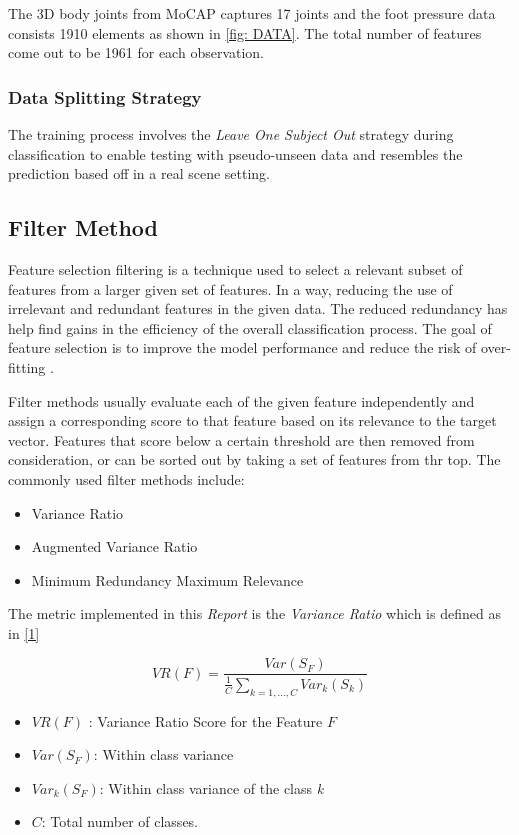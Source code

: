 \documentclass[12pt,twoside,a4paper]{article}
\begin{document}
The 3D body joints from MoCAP captures 17 joints and the foot pressure data consists 1910 elements as shown in \ref{fig: DATA}. The total number of features come out to be 1961 for each observation.
\subsubsection*{Data Splitting Strategy}
The training process involves the \textit{Leave One Subject Out} strategy during classification to enable testing with pseudo-unseen data and resembles the prediction based off in a real scene setting. 

\subsection{Filter Method}

Feature selection filtering is a technique used to select a relevant subset of features from a larger given set of features. In a way, reducing the use of irrelevant and redundant features in the given data. The reduced redundancy has help find gains in the efficiency of the overall classification process. The goal of feature selection is to improve the model performance and reduce the risk of over-fitting \cite{statistical}.

Filter methods usually evaluate each of the given feature independently and assign a corresponding score to that feature based on its relevance to the target vector. Features that score below a certain threshold are then removed from consideration, or can be sorted out by taking a set of features from thr top. The commonly used filter methods include:

\begin{itemize}
    \item Variance Ratio
    \item Augmented Variance Ratio
    \item Minimum Redundancy Maximum Relevance
\end{itemize}

The metric implemented in this \textit{Report} is the \textit{Variance Ratio} which is defined as in \eqref{1}

\begin{equation}\label{1}
    VR(F) = \frac{Var(S_F)}{\frac{1}{C}\sum_{k = 1,...,C} Var_k(S_k)}
\end{equation}

\begin{itemize}
    \item $VR(F)$ : Variance Ratio Score for the Feature $F$
    \item $Var(S_F)$: Within class variance
    \item $Var_k(S_F)$: Within class variance of the class \textit{k}
    \item $C$: Total number of classes.
\end{itemize}
\end{document}
